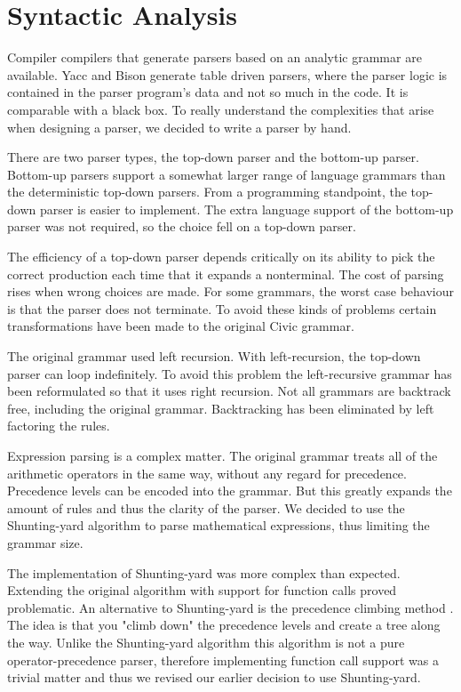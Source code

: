 \documentclass[12pt]{article}
\begin{document}
\section{Syntactic Analysis}

Compiler compilers that generate parsers based on an analytic grammar are available. Yacc and Bison generate table driven parsers, where the parser logic is contained in the parser program's data and not so much in the code. It is comparable with a black box. To really understand the complexities that arise when designing a parser, we decided to write a parser by hand.

There are two parser types, the top-down parser and the bottom-up parser. Bottom-up parsers support a somewhat larger range of language grammars than the deterministic top-down parsers. From a programming standpoint, the top-down parser is easier to implement. The extra language support of the bottom-up parser was not required, so the choice fell on a top-down parser.  

The efficiency of a top-down parser depends critically on its ability to pick the correct production each time that it expands a nonterminal. The cost of parsing rises when wrong choices are made. For some grammars, the worst case behaviour is that the parser does not terminate. To avoid these kinds of problems certain transformations have been made to the original Civic grammar.

The original grammar used left recursion. With left-recursion, the top-down parser can loop indefinitely. To avoid this problem the left-recursive grammar has been reformulated so that it uses right recursion. Not all grammars are backtrack free, including the original grammar. Backtracking has been eliminated by left factoring the rules.

Expression parsing is a complex matter. The original grammar treats all of the arithmetic operators in the same way, without any regard for precedence. Precedence levels can be encoded into the grammar. But this greatly expands the amount of rules and thus the clarity of the parser. We decided to use the Shunting-yard algorithm \cite{dijkstrashunting} to parse mathematical expressions, thus limiting the grammar size. 

The implementation of Shunting-yard was more complex than expected. Extending the original algorithm with support for function calls proved problematic. An alternative to Shunting-yard is the precedence climbing method \cite{richards1981bcpl}. The idea is that you "climb down" the precedence levels and create a tree along the way. Unlike the Shunting-yard algorithm this algorithm is not a pure operator-precedence parser, therefore implementing function call support was a trivial matter and thus we revised our earlier decision to use Shunting-yard.
\end{document}
